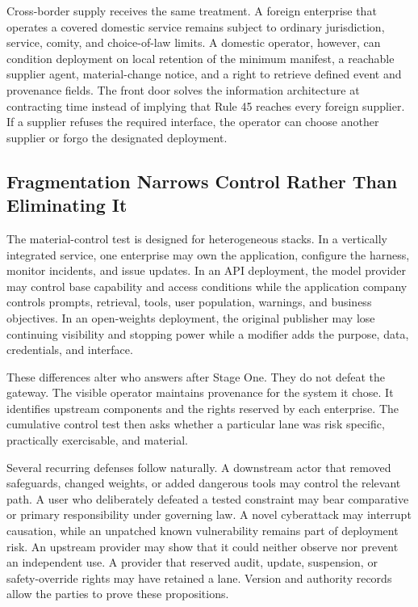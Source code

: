 Cross-border supply receives the same treatment. A foreign enterprise that operates a covered domestic service remains subject to ordinary jurisdiction, service, comity, and choice-of-law limits. A domestic operator, however, can condition deployment on local retention of the minimum manifest, a reachable supplier agent, material-change notice, and a right to retrieve defined event and provenance fields. The front door solves the information architecture at contracting time instead of implying that Rule 45 reaches every foreign supplier. If a supplier refuses the required interface, the operator can choose another supplier or forgo the designated deployment.

\subsection{Fragmentation Narrows Control Rather Than Eliminating It}

The material-control test is designed for heterogeneous stacks. In a vertically integrated service, one enterprise may own the application, configure the harness, monitor incidents, and issue updates. In an API deployment, the model provider may control base capability and access conditions while the application company controls prompts, retrieval, tools, user population, warnings, and business objectives. In an open-weights deployment, the original publisher may lose continuing visibility and stopping power while a modifier adds the purpose, data, credentials, and interface.

These differences alter who answers after Stage One. They do not defeat the gateway. The visible operator maintains provenance for the system it chose. It identifies upstream components and the rights reserved by each enterprise. The cumulative control test then asks whether a particular lane was risk specific, practically exercisable, and material.

Several recurring defenses follow naturally. A downstream actor that removed safeguards, changed weights, or added dangerous tools may control the relevant path. A user who deliberately defeated a tested constraint may bear comparative or primary responsibility under governing law. A novel cyberattack may interrupt causation, while an unpatched known vulnerability remains part of deployment risk. An upstream provider may show that it could neither observe nor prevent an independent use. A provider that reserved audit, update, suspension, or safety-override rights may have retained a lane. Version and authority records allow the parties to prove these propositions.

